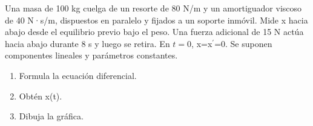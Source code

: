 Una masa de 100 kg cuelga de un resorte de 80 N/m y un amortiguador viscoso de 40 N·s/m, dispuestos en paralelo y fijados a un soporte inmóvil. Mide x hacia abajo desde el equilibrio previo bajo el peso. Una fuerza adicional de 15 N actúa hacia abajo durante 8 s y luego se retira. En \(t=0\), x=x\ensuremath{^{\prime}}=0. Se suponen componentes lineales y parámetros constantes.

\begin{enumerate}[label=(\alph*),ref=\alph*,leftmargin=*]
\item Formula la ecuación diferencial.
\item Obtén x(t).
\item Dibuja la gráfica.
\end{enumerate}
